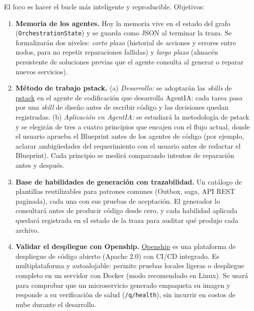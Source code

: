 \documentclass[11pt,a4paper]{article}
\begin{document}
El foco es hacer el bucle más inteligente y reproducible. Objetivos:

\begin{enumerate}

    \item \textbf{Memoria de los agentes.}
    Hoy la memoria vive en el estado del grafo (\texttt{OrchestrationState}) y se guarda como JSON al terminar la traza. Se formalizarán dos niveles: \textit{corto plazo} (historial de acciones y errores entre nodos, para no repetir reparaciones fallidas) y \textit{largo plazo} (almacén persistente de soluciones previas que el agente consulta al generar o reparar nuevos servicios).

    \item \textbf{Método de trabajo pstack.}
    (a) \textit{Desarrollo:} se adoptarán las \textit{skills} de \href{https://github.com/michael-denyer/pstack-claude}{pstack} en el agente de codificación que desarrolla AgentIA: cada tarea pasa por una \textit{skill} de diseño antes de escribir código y las decisiones quedan registradas.
    (b) \textit{Aplicación en AgentIA:} se estudiará la metodología de pstack y se elegirán de tres a cuatro principios que encajen con el flujo actual, donde el usuario aprueba el Blueprint antes de los agentes de código (por ejemplo, aclarar ambigüedades del requerimiento con el usuario antes de redactar el Blueprint). Cada principio se medirá comparando intentos de reparación antes y después.


    \item \textbf{Base de habilidades de generación con trazabilidad.}
    Un catálogo de plantillas reutilizables para patrones comunes (Outbox, saga, API REST paginada), cada una con sus pruebas de aceptación. El generador lo consultará antes de producir código desde cero, y cada habilidad aplicada quedará registrada en el estado de la traza para auditar qué produjo cada archivo.

    \item \textbf{Validar el despliegue con Openship.}
    \href{https://github.com/oblien/openship}{Openship} es una plataforma de despliegue de código abierto (Apache 2.0) con CI/CD integrado. Es multiplataforma y autoalojable: permite pruebas locales ligeras o despliegue completo en un servidor con Docker (modo recomendado en Linux). Se usará para comprobar que un microservicio generado empaqueta su imagen y responde a su verificación de salud (\texttt{/q/health}), sin incurrir en costos de nube durante el desarrollo.

\end{enumerate}
\end{document}
